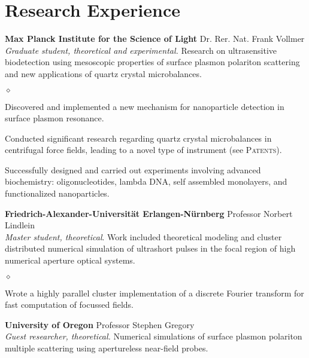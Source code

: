 \documentclass{webster-resume}
\newenvironment{list3}{
  \begin{list}{$\diamond$}{%
      \setlength{\itemsep}{-0.05in}
      \setlength{\parsep}{.05in} \setlength{\parskip}{0in}
      \setlength{\topsep}{0in} \setlength{\partopsep}{0in} 
      \setlength{\leftmargin}{0.2in}}}{\end{list}}
\begin{document}
\vspace{-1em}
\section{Research Experience}
\vspace{-0.25em}
\begin{resitem}[2011-present]
 {\bf Max Planck Institute for the Science of Light} Dr\@. Rer\@. Nat\@.  Frank Vollmer \\
 \textsl{Graduate student, theoretical and experimental.}  Research on ultrasensitive biodetection using
 mesoscopic properties of surface plasmon polariton scattering and new
applications of quartz crystal microbalances.
 \begin{list3}
	\item Discovered and implemented a new mechanism for nanoparticle detection in surface plasmon resonance.
 \item Conducted significant research regarding quartz crystal
  microbalances in centrifugal force fields, leading to a novel type of instrument (see \textsc{Patents}).
 \item Successfully designed and carried out experiments involving advanced
  biochemistry: oligonucleotides, lambda DNA, self assembled monolayers,
  and functionalized nanoparticles.
 \end{list3}
\end{resitem}

\begin{resitem}[2010-2011]
{\bf Friedrich-Alexander-Universität Erlangen-Nürnberg} Professor Norbert Lindlein\\
\textsl{Master student, theoretical}.  Work included theoretical modeling and cluster distributed numerical
simulation of ultrashort pulses in the focal region of high numerical
aperture optical systems.
 \begin{list3}
 \item{Wrote a highly parallel cluster implementation of a discrete Fourier
  transform for fast computation of focussed fields.}
 \end{list3} 
\end{resitem}

\begin{resitem}[2009-2010]
{\bf University of Oregon} Professor Stephen Gregory\\
\textsl{Guest researcher, theoretical.}  Numerical simulations of surface plasmon polariton
multiple scattering using apertureless near-field probes.
\end{resitem}
\end{document}
